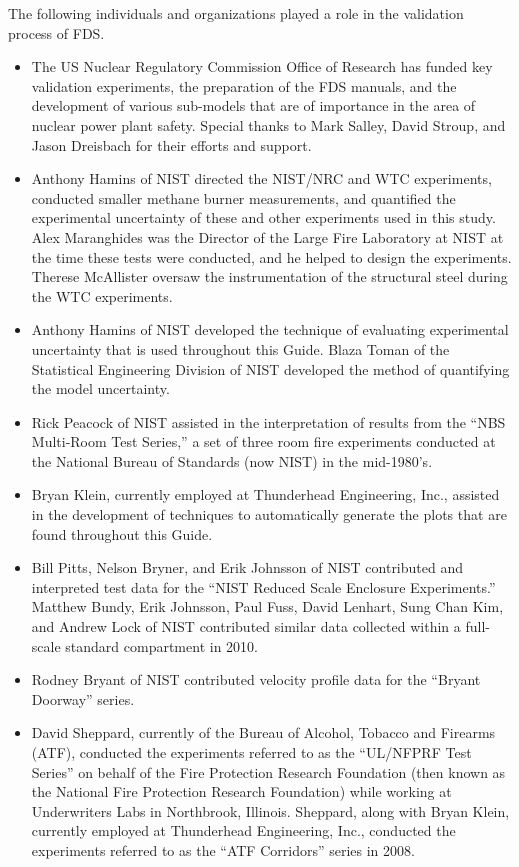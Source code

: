 \documentclass[11pt]{book}
\begin{document}
The following individuals and organizations played a role in the validation process of FDS.
\begin{itemize}
\item The US Nuclear Regulatory Commission Office of Research has funded key validation experiments, the preparation of the FDS manuals, and the development of various sub-models that are of importance in the area of nuclear power plant safety. Special thanks to Mark Salley, David Stroup, and Jason Dreisbach for their efforts and support.
\item Anthony Hamins of NIST directed the NIST/NRC and WTC experiments, conducted smaller methane burner measurements, and quantified the experimental uncertainty of these and other experiments used in this study. Alex Maranghides was the Director of the Large Fire Laboratory at NIST at the time these tests were conducted, and he helped to design the experiments. Therese McAllister oversaw the instrumentation of the structural steel during the WTC experiments.
\item Anthony Hamins of NIST developed the technique of evaluating experimental uncertainty that is used throughout this Guide. Blaza Toman of the Statistical Engineering Division of NIST developed the method of quantifying the model uncertainty.
\item Rick Peacock of NIST assisted in the interpretation of results from the ``NBS Multi-Room Test Series,'' a set of three room fire experiments conducted at the National Bureau of Standards (now NIST) in the mid-1980's.
\item Bryan Klein, currently employed at Thunderhead Engineering, Inc., assisted in the development of techniques to automatically generate the plots that are found throughout this Guide.
\item Bill Pitts, Nelson Bryner, and Erik Johnsson of NIST contributed and interpreted test data for the ``NIST Reduced Scale Enclosure Experiments.'' Matthew Bundy, Erik Johnsson, Paul Fuss, David Lenhart, Sung Chan Kim, and Andrew Lock of NIST contributed similar data collected within a full-scale standard compartment in 2010.
\item Rodney Bryant of NIST contributed velocity profile data for the ``Bryant Doorway'' series.
\item David Sheppard, currently of the Bureau of Alcohol, Tobacco and Firearms (ATF), conducted the experiments referred to as the ``UL/NFPRF Test Series'' on behalf of the Fire Protection Research Foundation (then known as the National Fire Protection Research Foundation) while working at Underwriters Labs in Northbrook, Illinois. Sheppard, along with Bryan Klein, currently employed at Thunderhead Engineering, Inc., conducted the experiments referred to as the ``ATF Corridors'' series in 2008.

\end{itemize}
\end{document}
